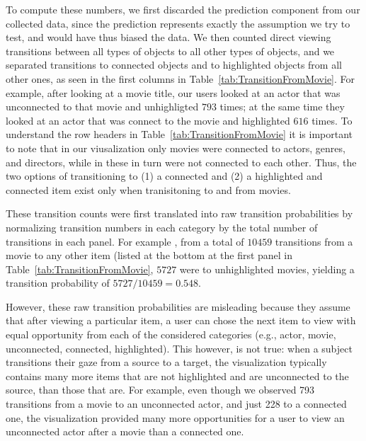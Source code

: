 To compute these numbers, we first discarded the prediction component from our collected data, since the prediction represents exactly the assumption we try to test, and would have thus biased the data. We then counted direct viewing transitions between all types of objects to all other types of objects, and we separated transitions to connected objects and to highlighted objects from all other ones, as seen in the first columns in Table~\ref{tab:TransitionFromMovie}.  For example, after looking at a movie title, our users looked at an actor that was unconnected to that movie and unhighligted $793$ times; at the same time they looked at an actor that was connect to the movie and highlighted $616$ times. To understand the row headers in Table~\ref{tab:TransitionFromMovie} it is important to note that in our viusalization only movies were connected to actors, genres, and directors, while in these in turn were not connected to each other. Thus, the two options of transitioning to (1) a connected and (2) a highlighted and connected item exist only when tranisitoning to and from movies.    

These transition counts were first translated into raw transition probabilities by normalizing transition numbers in each category by the total number of transitions in each panel. For example , from a total of $10459$ transitions from a movie to any other item (listed at the bottom at the first panel in Table~\ref{tab:TransitionFromMovie}, $5727$ were to unhighlighted movies, yielding a transition probability of $5727 / 10459 = 0.548$.

However, these raw transition probabilities are misleading because they assume that after viewing a particular item, a user can chose the next item to view with equal opportunity from each of the considered categories (e.g., actor, movie, unconnected, connected, highlighted). This however, is not true: when a subject transitions their gaze from a source to a target, the visualization typically contains many more items that are not highlighted and are unconnected to the source, than those that are. For example, even though we observed 793 transitions from a movie to an unconnected actor, and just 228 to a connected one, the visualization provided many more opportunities for a user to view an unconnected actor after a movie than a connected one.


